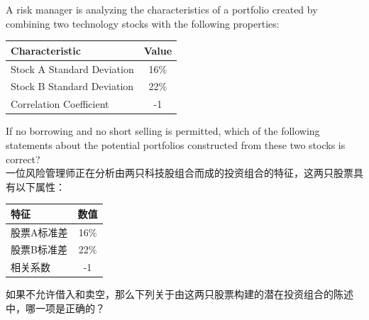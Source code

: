 \documentclass{article}
\newcounter{question} %
\begin{document}
\begin{question}
    A risk manager is analyzing the characteristics of a portfolio created by combining two technology stocks with the following properties:

    \begin{center}
        \begin{tabular}{|l|c|}
            \hline
            \textbf{Characteristic} & \textbf{Value} \\
            \hline
            Stock A Standard Deviation & 16\% \\
            \hline
            Stock B Standard Deviation & 22\% \\
            \hline
            Correlation Coefficient & -1 \\
            \hline
        \end{tabular}
    \end{center}

    If no borrowing and no short selling is permitted, which of the following statements about the potential portfolios constructed from these two stocks is correct?
    \\
    一位风险管理师正在分析由两只科技股组合而成的投资组合的特征，这两只股票具有以下属性：

    \begin{center}
        \begin{tabular}{|l|c|}
            \hline
            \textbf{特征} & \textbf{数值} \\
            \hline
            股票A标准差 & 16\% \\
            \hline
            股票B标准差 & 22\% \\
            \hline
            相关系数 & -1 \\
            \hline
        \end{tabular}
    \end{center}

    如果不允许借入和卖空，那么下列关于由这两只股票构建的潜在投资组合的陈述中，哪一项是正确的？
\end{question}
\end{document}
